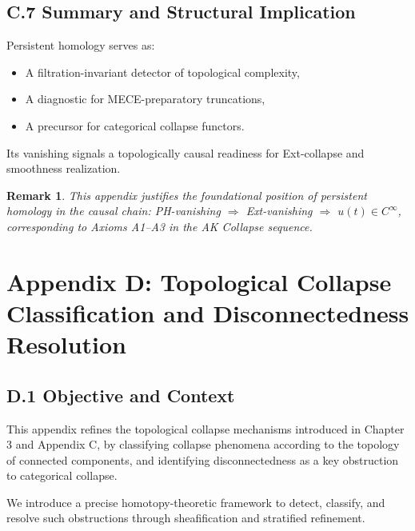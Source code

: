 \documentclass[11pt]{article}
\newtheorem{remark}[theorem]{Remark}
\begin{document}
\subsection*{C.7 Summary and Structural Implication}

Persistent homology serves as:

\begin{itemize}
  \item A filtration-invariant detector of topological complexity,
  \item A diagnostic for MECE-preparatory truncations,
  \item A precursor for categorical collapse functors.
\end{itemize}

Its vanishing signals a topologically causal readiness for Ext-collapse and smoothness realization.

\begin{remark}
This appendix justifies the foundational position of persistent homology in the causal chain:  
PH-vanishing \(\Rightarrow\) Ext-vanishing \(\Rightarrow\) \( u(t) \in C^\infty \),  
corresponding to Axioms A1–A3 in the AK Collapse sequence.
\end{remark}



\section*{Appendix D: Topological Collapse Classification and Disconnectedness Resolution}

\subsection*{D.1 Objective and Context}

This appendix refines the topological collapse mechanisms introduced in Chapter 3 and Appendix C,  
by classifying collapse phenomena according to the topology of connected components,  
and identifying disconnectedness as a key obstruction to categorical collapse.

We introduce a precise homotopy-theoretic framework to detect, classify, and resolve such obstructions  
through sheafification and stratified refinement.
\end{document}
